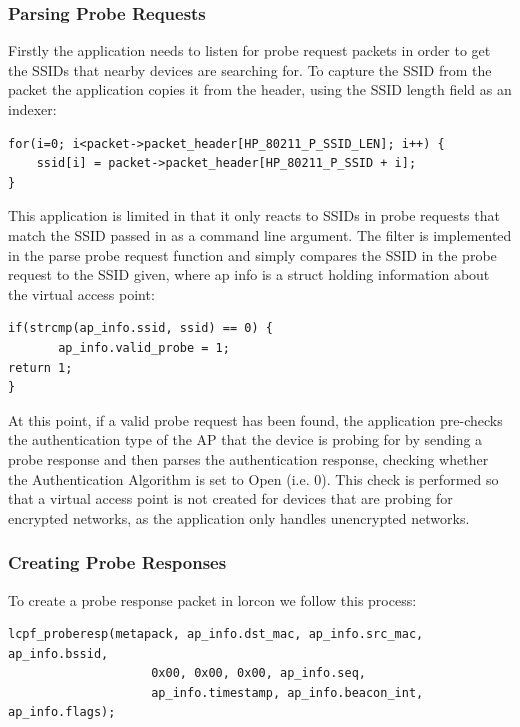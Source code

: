 \subsubsection{Parsing Probe Requests}

Firstly the application needs to listen for probe request packets in order to get the SSIDs that nearby devices are searching for. To capture the SSID from the packet the application copies it from the header, using the SSID length field as an indexer:

\begin{verbatim}
for(i=0; i<packet->packet_header[HP_80211_P_SSID_LEN]; i++) {
	ssid[i] = packet->packet_header[HP_80211_P_SSID + i];
}
\end{verbatim}

This application is limited in that it only reacts to SSIDs in probe requests that match the SSID passed in as a command line argument. The filter is implemented in the parse probe request function and simply compares the SSID in the probe request to the SSID given, where ap info is a struct holding information about the virtual access point:

\begin{verbatim}
if(strcmp(ap_info.ssid, ssid) == 0) {
       ap_info.valid_probe = 1;
return 1;
}
\end{verbatim}

At this point, if a valid probe request has been found, the application pre-checks the authentication type of the AP that the device is probing for by sending a probe response and then parses the authentication response, checking whether the Authentication Algorithm is set to Open (i.e. 0). This check is performed so that a virtual access point is not created for devices that are probing for encrypted networks, as the application only handles unencrypted networks.

\subsubsection{Creating Probe Responses}

To create a probe response packet in lorcon we follow this process:

\begin{verbatim}
lcpf_proberesp(metapack, ap_info.dst_mac, ap_info.src_mac, ap_info.bssid, 
					0x00, 0x00, 0x00, ap_info.seq, 
					ap_info.timestamp, ap_info.beacon_int, ap_info.flags);
\end{verbatim}

